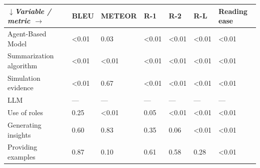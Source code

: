 \begin{tabular}{|l|l|l|l|l|l|l|}
\hline
\textit{$\downarrow$Variable / metric $\rightarrow$} & BLEU & METEOR & R-1 & R-2 & R-L & Reading ease \\
 \hline
 Agent-Based Model & \textless{}0.01 & 0.03 & \textless{}0.01 & \textless{}0.01 & \textless{}0.01 & \textless{}0.01 \\
 \hline
 Summarization algorithm & \textless{}0.01 & \textless{}0.01 & \textless{}0.01 & \textless{}0.01 & \textless{}0.01 & \textless{}0.01 \\
 \hline
 Simulation evidence & \textless{}0.01 & 0.67 & \textless{}0.01 & \textless{}0.01 & \textless{}0.01 & \textless{}0.01 \\
 \hline
 LLM & — & — & — & — & — & — \\
 \hline
 Use of roles & 0.25 & \textless{}0.01 & 0.05 & \textless{}0.01 & \textless{}0.01 & \textless{}0.01 \\
 \hline
 Generating insights & 0.60 & 0.83 & 0.35 & 0.06 & \textless{}0.01 & \textless{}0.01 \\
 \hline
 Providing examples & 0.87 & 0.10 & 0.61 & 0.58 & 0.28 & \textless{}0.01 \\
\hline
\end{tabular}
